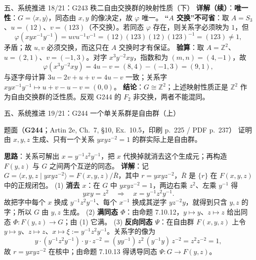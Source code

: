 \documentclass[aspectratio=169,10pt,fontset=none]{ctexbeamer}
\newcommand{\ex}[1]{\textcolor{accent}{\footnotesize\bfseries #1}}
\newcommand{\key}[1]{\textcolor{ink}{\bfseries #1}}
\begin{document}
\begin{frame}[t]{五、系统推进 18/21：G243 秩二自由交换群的映射性质（下）}
\scriptsize
\key{详解（续）}：\textbf{唯一性}：$G=\langle x,y\rangle$，同态由 $x,y$ 的像决定，故 $\varphi$ 唯一。
\textbf{“$A$ 交换”不可省}：取 $A=S_3$、$u=(12)$、$v=(123)$（不交换）。若同态 $\varphi$ 存在，则关系字必须映为 $1$，但
\[ \varphi(xyx^{-1}y^{-1})=uvu^{-1}v^{-1}=(12)(123)(12)(123)^{-1}=(123)\ne1, \]
矛盾；故 $u,v$ 必须交换，而这只在 $A$ 交换时才有保证。
\key{验算}：取 $A=\mathbb Z^2$、$u=(2,1)$、$v=(-1,3)$。对字 $x^3y^{-2}xy$，指数和为 $(m,n)=(4,-1)$，故
\[ \varphi(x^3y^{-2}xy)=4u-v=(8,4)-(-1,3)=(9,1), \]
与逐字母计算 $3u-2v+u+v=4u-v$ 一致；关系字 $xyx^{-1}y^{-1}\mapsto u+v-u-v=(0,0)$。
\key{结论}：$G\cong\mathbb Z^2$；上述映射性质正是 $\mathbb Z^2$ 作为自由交换群的泛性质。反观 G244 的 $F_2$ 非交换，两者不能混同。
\end{frame}

\begin{frame}[t]{五、系统推进 19/21：G244 一个单关系群是自由群（上）}
\label{ex:G244}
\scriptsize
\begin{block}{\footnotesize 题面（\ex{G244}；Artin 2e, Ch.~7, \S10, Ex.~10.5，印刷 p.~225 / PDF p.~237）}
证明由 $x,y,z$ 生成、只有一个关系 $yxyz^{-2}=1$ 的群实际上是自由群。
\end{block}
\key{思路}：关系可解出 $x=y^{-1}z^2y^{-1}$，把 $x$ 代换掉就消去这个生成元；再构造 $F(y,z)$ 与 $G$ 之间两个互逆的同态。
\key{详解}：记 $G=\langle x,y,z\mid yxyz^{-2}\rangle=F(x,y,z)/\bar R$，其中 $r=yxyz^{-2}$，$\bar R$ 是 $\{r\}$ 在 $F(x,y,z)$ 中的正规闭包。
(1) \textbf{消去 $x$}：在 $G$ 中 $yxyz^{-2}=1$，两边右乘 $z^2$、左乘 $y^{-1}$ 得
\[ yxy=z^2\quad\Longrightarrow\quad x=y^{-1}z^2y^{-1}. \]
故把字中每个 $x$ 换成 $y^{-1}z^2y^{-1}$、每个 $x^{-1}$ 换成其逆字 $yz^{-2}y$，就得到只含 $y,z$ 的字；所以 $G$ 由 $y,z$ 生成。
(2) \textbf{满同态 $\Phi$}：由命题 7.10.12，$y\mapsto y$、$z\mapsto z$ 给出同态 $\Phi:F(y,z)\to G$；由 (1) 它满。
(3) \textbf{反向同态 $\Psi$}：在自由群 $F(x,y,z)$ 上令 $y\mapsto y$、$z\mapsto z$、$x\mapsto\xi:=y^{-1}z^2y^{-1}$。关系字的像为
\[ y\cdot(y^{-1}z^2y^{-1})\cdot y\cdot z^{-2}=(yy^{-1})\,z^2\,(y^{-1}y)\,z^{-2}=z^2z^{-2}=1, \]
故 $r=yxyz^{-2}$ 在核中；由命题 7.10.13 得诱导同态 $\Psi:G\to F(y,z)$。
\end{frame}
\end{document}
